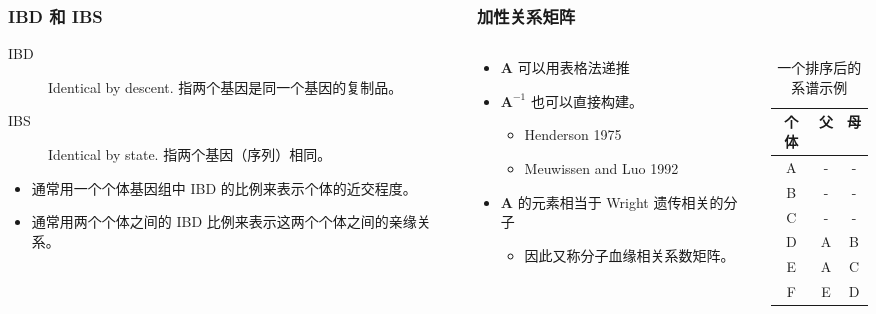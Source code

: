 \documentclass[serif,aspectratio=169]{beamer}
\begin{document}
\begin{frame}
\begin{columns}
\begin{frame}
  \frametitle{IBD 和 IBS}
  \begin{description}
  \item [IBD] Identical by descent. 指两个基因是同一个基因的复制品。
  \item [IBS] Identical by state. 指两个基因（序列）相同。
  \end{description}
  \begin{itemize}
  \item 通常用一个个体基因组中 IBD 的比例来表示个体的近交程度。
  \item 通常用两个个体之间的 IBD 比例来表示这两个个体之间的亲缘关系。
  \end{itemize}
\end{frame}


\begin{frame}
  \frametitle{加性关系矩阵}
  \begin{columns}
    \begin{column}{.5\textwidth}
      \begin{itemize}
      \item $\mathbf{A}$ 可以用表格法递推
      \item $\mathbf{A}^{-1}$ 也可以直接构建。
        \begin{itemize}
        \item Henderson 1975
        \item Meuwissen and Luo 1992
        \end{itemize}
      \item $\mathbf{A}$ 的元素相当于 Wright 遗传相关的分子
        \begin{itemize}
        \item 因此又称分子血缘相关系数矩阵。
        \end{itemize}
      \end{itemize}
    \end{column}

    \pause
    \begin{column}{.5\textwidth}
      \begin{table}
        \caption{一个排序后的系谱示例}
        \begin{tabular}{ccc}
          个体 & 父 & 母\\\hline
          A & - & -\\
          B & - & -\\
          C & - & -\\
          D & A & B\\
          E & A & C\\
          F & E & D
        \end{tabular}
      \end{table}
    \end{column}
  \end{columns}
\end{frame}



\end{columns}
\end{frame}
\end{document}
